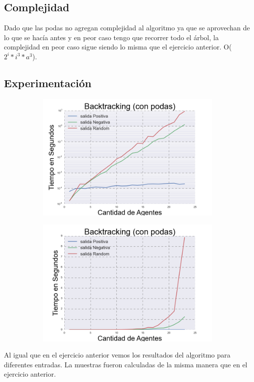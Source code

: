 \subsection{Complejidad}

	Dado que las podas no agregan complejidad al algoritmo ya que se aprovechan de lo que se hacía antes y en peor caso tengo que recorrer todo el árbol, la complejidad en peor caso sigue siendo lo misma que el ejercicio anterior. O($2^{i}*i^{3}*a^{3}$). 
	
\subsection{Experimentación}

\begin{figure}[h]

\begin{subfigure}{0.5\textwidth}
\includegraphics[scale=0.45]{BacktrackingPodasLog.png}
\end{subfigure}
\begin{subfigure}{0.5\textwidth}
\includegraphics[scale=0.45]{BacktrackingPodas.png}
\end{subfigure}

\end{figure}

	Al igual que en el ejercicio anterior vemos los resultados del algoritmo para diferentes entradas. La muestras fueron calculadas de la misma manera que en el ejercicio anterior.